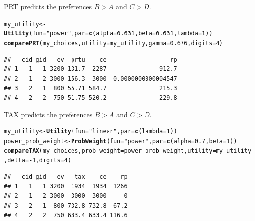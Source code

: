 \documentclass{article}\usepackage[]{graphicx}\usepackage[]{color}
\makeatletter
\newcommand{\hlnum}[1]{\textcolor[rgb]{0.686,0.059,0.569}{#1}}%
\newcommand{\hlstr}[1]{\textcolor[rgb]{0.192,0.494,0.8}{#1}}%
\newcommand{\hlopt}[1]{\textcolor[rgb]{0,0,0}{#1}}%
\newcommand{\hlstd}[1]{\textcolor[rgb]{0.345,0.345,0.345}{#1}}%
\newcommand{\hlkwb}[1]{\textcolor[rgb]{0.69,0.353,0.396}{#1}}%
\newcommand{\hlkwc}[1]{\textcolor[rgb]{0.333,0.667,0.333}{#1}}%
\newcommand{\hlkwd}[1]{\textcolor[rgb]{0.737,0.353,0.396}{\textbf{#1}}}%
\newenvironment{kframe}{%
 \def\at@end@of@kframe{}%
 \ifinner\ifhmode%
  \def\at@end@of@kframe{\end{minipage}}%
  \begin{minipage}{\columnwidth}%
 \fi\fi%
 \def\FrameCommand##1{\hskip\@totalleftmargin \hskip-\fboxsep
 \colorbox{shadecolor}{##1}\hskip-\fboxsep
     \hskip-\linewidth \hskip-\@totalleftmargin \hskip\columnwidth}%
 \MakeFramed {\advance\hsize-\width
   \@totalleftmargin\z@ \linewidth\hsize
   \@setminipage}}%
 {\par\unskip\endMakeFramed%
 \at@end@of@kframe}
\newenvironment{knitrout}{}{} %
\makeatother
\begin{document}
PRT predicts the preferences $B > A$ and $C > D$.

\begin{knitrout}
\color{fgcolor}\begin{kframe}
\begin{alltt}
\hlstd{my_utility} \hlkwb{<-} \hlkwd{Utility}\hlstd{(}\hlkwc{fun}\hlstd{=}\hlstr{"power"}\hlstd{,} \hlkwc{par}\hlstd{=}\hlkwd{c}\hlstd{(}\hlkwc{alpha}\hlstd{=}\hlnum{0.631}\hlstd{,} \hlkwc{beta}\hlstd{=}\hlnum{0.631}\hlstd{,} \hlkwc{lambda}\hlstd{=}\hlnum{1}\hlstd{))}
\hlkwd{comparePRT}\hlstd{(my_choices,} \hlkwc{utility}\hlstd{=my_utility,} \hlkwc{gamma}\hlstd{=}\hlnum{0.676}\hlstd{,} \hlkwc{digits}\hlstd{=}\hlnum{4}\hlstd{)}
\end{alltt}
\begin{verbatim}
##   cid gid   ev  prtu    ce                  rp
## 1   1   1 3200 131.7  2287               912.7
## 2   1   2 3000 156.3  3000 -0.0000000000004547
## 3   2   1  800 55.71 584.7               215.3
## 4   2   2  750 51.75 520.2               229.8
\end{verbatim}
\end{kframe}
\end{knitrout}


TAX predicts the preferences $B > A$ and $C > D$.

\begin{knitrout}
\color{fgcolor}\begin{kframe}
\begin{alltt}
\hlstd{my_utility} \hlkwb{<-} \hlkwd{Utility}\hlstd{(}\hlkwc{fun}\hlstd{=}\hlstr{"linear"}\hlstd{,} \hlkwc{par}\hlstd{=}\hlkwd{c}\hlstd{(}\hlkwc{lambda}\hlstd{=}\hlnum{1}\hlstd{))}
\hlstd{power_prob_weight} \hlkwb{<-} \hlkwd{ProbWeight}\hlstd{(}\hlkwc{fun}\hlstd{=}\hlstr{"power"}\hlstd{,} \hlkwc{par}\hlstd{=}\hlkwd{c}\hlstd{(}\hlkwc{alpha}\hlstd{=}\hlnum{0.7}\hlstd{,} \hlkwc{beta}\hlstd{=}\hlnum{1}\hlstd{))}
\hlkwd{compareTAX}\hlstd{(my_choices,} \hlkwc{prob_weight}\hlstd{=power_prob_weight,} \hlkwc{utility}\hlstd{=my_utility,} \hlkwc{delta}\hlstd{=}\hlopt{-}\hlnum{1}\hlstd{,} \hlkwc{digits}\hlstd{=}\hlnum{4}\hlstd{)}
\end{alltt}
\begin{verbatim}
##   cid gid   ev   tax    ce    rp
## 1   1   1 3200  1934  1934  1266
## 2   1   2 3000  3000  3000     0
## 3   2   1  800 732.8 732.8  67.2
## 4   2   2  750 633.4 633.4 116.6
\end{verbatim}
\end{kframe}
\end{knitrout}
\end{document}
